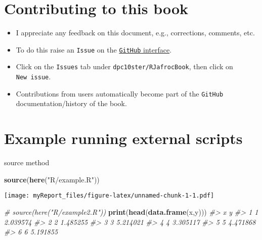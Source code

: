 \documentclass[
]{book}
\newenvironment{Shaded}{\begin{snugshade}}{\end{snugshade}}
\newcommand{\CommentTok}[1]{\textcolor[rgb]{0.56,0.35,0.01}{\textit{#1}}}
\newcommand{\KeywordTok}[1]{\textcolor[rgb]{0.13,0.29,0.53}{\textbf{#1}}}
\newcommand{\NormalTok}[1]{#1}
\newcommand{\StringTok}[1]{\textcolor[rgb]{0.31,0.60,0.02}{#1}}
\providecommand{\tightlist}{%
  \setlength{\itemsep}{0pt}\setlength{\parskip}{0pt}}
\begin{document}
\hypertarget{contributing-to-this-book}{%
\chapter*{Contributing to this book}\label{contributing-to-this-book}}

\begin{itemize}
\tightlist
\item
  I appreciate any feedback on this document, e.g., corrections, comments, etc.\\
\item
  To do this raise an \texttt{Issue} on the \href{https://github.com/dpc10ster/RJafrocBook}{\texttt{GitHub} interface}.
\item
  Click on the \texttt{Issues} tab under \texttt{dpc10ster/RJafrocBook}, then click on \texttt{New\ issue}.
\item
  Contributions from users automatically become part of the \texttt{GitHub} documentation/history of the book.
\end{itemize}

\hypertarget{example-running-external-scripts}{%
\chapter{Example running external scripts}\label{example-running-external-scripts}}

source method

\begin{Shaded}
\begin{Highlighting}[]
\KeywordTok{source}\NormalTok{(}\KeywordTok{here}\NormalTok{(}\StringTok{"R/example.R"}\NormalTok{))}
\end{Highlighting}
\end{Shaded}

\texttt{[image: myReport\_files/figure-latex/unnamed-chunk-1-1.pdf]}

\begin{Shaded}
\begin{Highlighting}[]
\CommentTok{\# source(here("R/example2.R"))}
\KeywordTok{print}\NormalTok{(}\KeywordTok{head}\NormalTok{(}\KeywordTok{data.frame}\NormalTok{(x,y)))}
\CommentTok{\#\textgreater{}   x        y}
\CommentTok{\#\textgreater{} 1 1 2.039574}
\CommentTok{\#\textgreater{} 2 2 1.485255}
\CommentTok{\#\textgreater{} 3 3 5.214021}
\CommentTok{\#\textgreater{} 4 4 3.305117}
\CommentTok{\#\textgreater{} 5 5 4.471868}
\CommentTok{\#\textgreater{} 6 6 5.191855}
\end{Highlighting}
\end{Shaded}
\end{document}
